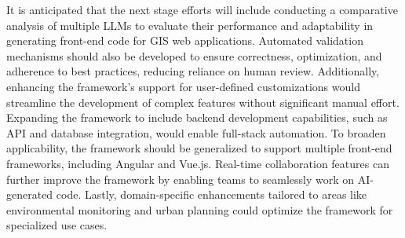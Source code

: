 It is anticipated that the next stage efforts will include conducting a comparative analysis of multiple LLMs to evaluate their performance and adaptability in generating front-end code for GIS web applications. Automated validation mechanisms should also be developed to ensure correctness, optimization, and adherence to best practices, reducing reliance on human review. Additionally, enhancing the framework's support for user-defined customizations would streamline the development of complex features without significant manual effort. Expanding the framework to include backend development capabilities, such as API and database integration, would enable full-stack automation. To broaden applicability, the framework should be generalized to support multiple front-end frameworks, including Angular and Vue.js. Real-time collaboration features can further improve the framework by enabling teams to seamlessly work on AI-generated code. Lastly, domain-specific enhancements tailored to areas like environmental monitoring and urban planning could optimize the framework for specialized use cases.